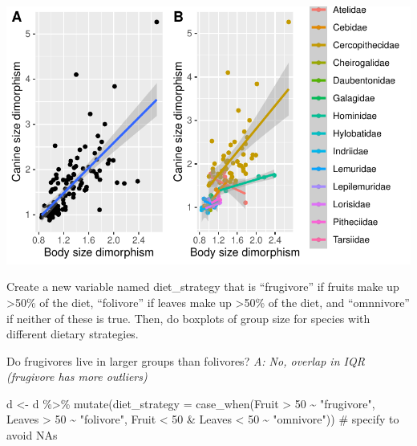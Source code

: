 \documentclass[
  letterpaper,
  DIV=11,
  numbers=noendperiod]{scrartcl}
\newenvironment{Shaded}{\begin{snugshade}}{\end{snugshade}}
\newcommand{\AttributeTok}[1]{\textcolor[rgb]{0.40,0.45,0.13}{#1}}
\newcommand{\CommentTok}[1]{\textcolor[rgb]{0.37,0.37,0.37}{#1}}
\newcommand{\DecValTok}[1]{\textcolor[rgb]{0.68,0.00,0.00}{#1}}
\newcommand{\FunctionTok}[1]{\textcolor[rgb]{0.28,0.35,0.67}{#1}}
\newcommand{\NormalTok}[1]{\textcolor[rgb]{0.00,0.23,0.31}{#1}}
\newcommand{\OtherTok}[1]{\textcolor[rgb]{0.00,0.23,0.31}{#1}}
\newcommand{\SpecialCharTok}[1]{\textcolor[rgb]{0.37,0.37,0.37}{#1}}
\newcommand{\StringTok}[1]{\textcolor[rgb]{0.13,0.47,0.30}{#1}}
\begin{document}
\includegraphics{EDA-challenge_files/figure-pdf/unnamed-chunk-5-3.pdf}

Create a new variable named diet\_strategy that is ``frugivore'' if
fruits make up \textgreater50\% of the diet, ``folivore'' if leaves make
up \textgreater50\% of the diet, and ``omnnivore'' if neither of these
is true. Then, do boxplots of group size for species with different
dietary strategies.

Do frugivores live in larger groups than folivores? \emph{A: No, overlap
in IQR (frugivore has more outliers)}

\begin{Shaded}
\begin{Highlighting}[]
\NormalTok{d }\OtherTok{\textless{}{-}}\NormalTok{ d }\SpecialCharTok{\%\textgreater{}\%} 
  \FunctionTok{mutate}\NormalTok{(}\AttributeTok{diet\_strategy =} \FunctionTok{case\_when}\NormalTok{(Fruit }\SpecialCharTok{\textgreater{}} \DecValTok{50} \SpecialCharTok{\textasciitilde{}} \StringTok{"frugivore"}\NormalTok{,}
\NormalTok{                                   Leaves }\SpecialCharTok{\textgreater{}} \DecValTok{50} \SpecialCharTok{\textasciitilde{}} \StringTok{"folivore"}\NormalTok{,}
\NormalTok{                                   Fruit }\SpecialCharTok{\textless{}} \DecValTok{50} \SpecialCharTok{\&}\NormalTok{ Leaves }\SpecialCharTok{\textless{}} \DecValTok{50} \SpecialCharTok{\textasciitilde{}} \StringTok{"omnivore"}\NormalTok{)) }\CommentTok{\# specify to avoid NAs}
\end{Highlighting}
\end{Shaded}
\end{document}
